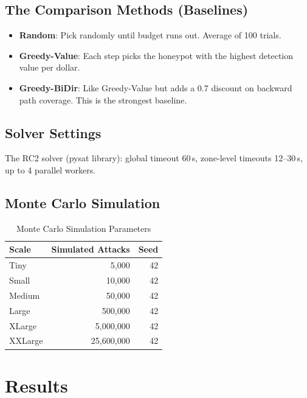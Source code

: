 \documentclass[journal]{IEEEtran}
\newcommand{\rcII}{\textsc{RC2}}
\begin{document}
\subsection{The Comparison Methods (Baselines)}

\begin{itemize}
  \item \textbf{Random}: Pick randomly until budget runs out.
        Average of 100 trials.
  \item \textbf{Greedy-Value}: Each step picks the honeypot
        with the highest detection value per dollar.
  \item \textbf{Greedy-BiDir}: Like Greedy-Value but adds
        a 0.7 discount on backward path coverage.
        This is the strongest baseline.
\end{itemize}

\subsection{Solver Settings}

The \rcII{} solver (pysat library): global timeout 60\,s,
zone-level timeouts 12--30\,s, up to 4 parallel workers.

\subsection{Monte Carlo Simulation}

\begin{table}[htbp]
\caption{Monte Carlo Simulation Parameters}
\label{tab:montecarlo}
\centering
\renewcommand{\arraystretch}{1.2}
\begin{tabular}{@{}lrr@{}}
\toprule
\textbf{Scale} & \textbf{Simulated Attacks} & \textbf{Seed} \\
\midrule
Tiny    &        5,000 & 42 \\
Small   &       10,000 & 42 \\
Medium  &       50,000 & 42 \\
Large   &      500,000 & 42 \\
XLarge  &    5,000,000 & 42 \\
XXLarge &   25,600,000 & 42 \\
\bottomrule
\end{tabular}
\end{table}

\section{Results}
\label{sec:results}
\end{document}
